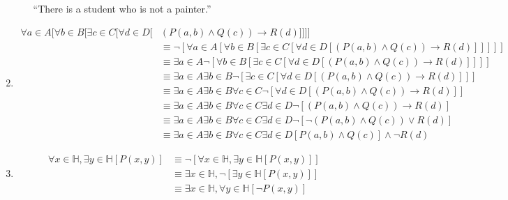 \documentclass{article}
\begin{document}
\begin{enumerate}
\begin{itemize}
                        ``There is a student who is not a painter.''

            \end{itemize}

            \newpage

      \item \begin{align}
                  \forall a \in A [\forall b \in B [\exists c \in C [\forall d \in D [ & ( P(a,b) \wedge Q(c) ) \rightarrow R(d) ]]]]                                                                                    \\
                                                                                       & \equiv \neg [\forall a \in A [\forall b \in B [\exists c \in C [\forall d \in D [ ( P(a,b) \wedge Q(c) ) \rightarrow R(d) ]]]]] \\
                                                                                       & \equiv \exists a \in A \neg [\forall b \in B [\exists c \in C [\forall d \in D [ ( P(a,b) \wedge Q(c) ) \rightarrow R(d) ]]]]   \\
                                                                                       & \equiv \exists a \in A \exists b \in B \neg [\exists c \in C [\forall d \in D [ ( P(a,b) \wedge Q(c) ) \rightarrow R(d) ]]]     \\
                                                                                       & \equiv \exists a \in A \exists b \in B \forall c \in C \neg [\forall d \in D [ ( P(a,b) \wedge Q(c) ) \rightarrow R(d) ]]       \\
                                                                                       & \equiv \exists a \in A \exists b \in B \forall c \in C \exists d \in D \neg [ ( P(a,b) \wedge Q(c) ) \rightarrow R(d) ]         \\
                                                                                       & \equiv \exists a \in A \exists b \in B \forall c \in C \exists d \in D \neg [ \neg ( P(a,b) \wedge Q(c) ) \vee R(d) ]           \\
                                                                                       & \equiv \exists a \in A \exists b \in B \forall c \in C \exists d \in D [P(a,b) \wedge Q(c)] \wedge \neg R(d)
            \end{align}

            \newpage

      \item \begin{align}
                  \forall x \in \mathbb{H}, \exists y \in \mathbb{H} [P(x,y)] & \equiv \neg [\forall x \in \mathbb{H}, \exists y \in \mathbb{H} [P(x,y)]] \\
                  & \equiv \exists x \in \mathbb{H}, \neg [\exists y \in \mathbb{H} [P(x,y)]] \\
                  & \equiv \exists x \in \mathbb{H}, \forall y \in \mathbb{H} [\neg P(x,y)]
            \end{align}


\end{enumerate}
\end{document}
